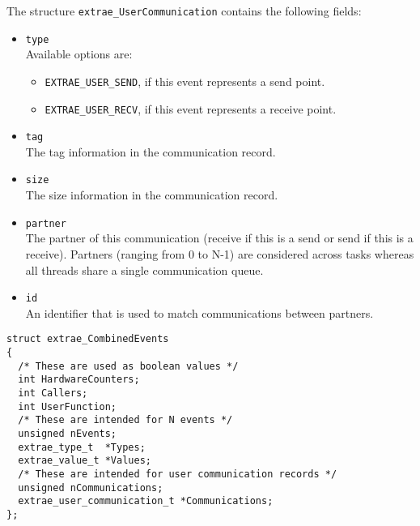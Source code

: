 The structure {\tt extrae\_UserCommunication} contains the following fields:
\begin{itemize}
	\item {\tt type}\\
	Available options are:
	\begin{itemize}
		\item {\tt EXTRAE\_USER\_SEND}, if this event represents a send point.
		\item {\tt EXTRAE\_USER\_RECV}, if this event represents a receive point.
	\end{itemize}
	\item {\tt tag}\\
	The tag information in the communication record. 
	\item {\tt size}\\
	The size information in the communication record.
	\item {\tt partner}\\
	The partner of this communication (receive if this is a send or send if this is a receive). Partners (ranging from 0 to N-1) are considered across tasks whereas all threads share a single communication queue.
	\item {\tt id}\\
	An identifier that is used to match communications between partners.
\end{itemize}

\begin{verbatim}
struct extrae_CombinedEvents
{
  /* These are used as boolean values */
  int HardwareCounters;
  int Callers;
  int UserFunction;
  /* These are intended for N events */
  unsigned nEvents;
  extrae_type_t  *Types;
  extrae_value_t *Values;
  /* These are intended for user communication records */
  unsigned nCommunications;
  extrae_user_communication_t *Communications;
};
\end{verbatim}

